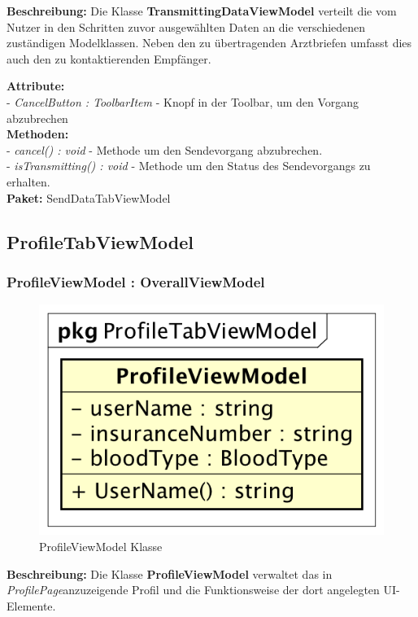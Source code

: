\documentclass[a4paper]{scrreprt}
\begin{document}
\textbf{Beschreibung:} Die Klasse \textbf{TransmittingDataViewModel} verteilt die vom Nutzer in den Schritten zuvor ausgewählten Daten an die verschiedenen zuständigen Modelklassen. Neben den zu übertragenden Arztbriefen umfasst dies auch den zu kontaktierenden Empfänger.

\textbf{Attribute:}\\
- \textit{CancelButton : ToolbarItem} - Knopf in der Toolbar, um den Vorgang abzubrechen\\

\textbf{Methoden:}\\
- \textit{cancel() : void} - Methode um den Sendevorgang abzubrechen.\\
- \textit{isTransmitting() : void} - Methode um den Status des Sendevorgangs zu erhalten.\\

\textbf{Paket:} SendDataTabViewModel

\subsection{ProfileTabViewModel}

\subsubsection{ProfileViewModel : OverallViewModel}
\begin{figure}[H]
\centering
\includegraphics[width=0.45\textheight]{graphics/Klassendiagramme/ViewModel/ProfileViewModel.png}
\caption{ProfileViewModel Klasse}
\end{figure}

\textbf{Beschreibung:} Die Klasse \textbf{ProfileViewModel} verwaltet das in \textit{ProfilePage}anzuzeigende Profil und die Funktionsweise der dort angelegten UI-Elemente.
\end{document}
